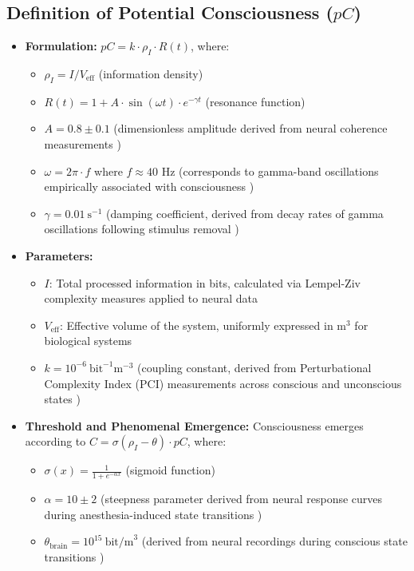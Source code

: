\documentclass[12pt]{article}
\begin{document}
\subsection{Definition of Potential Consciousness ($pC$)}
\begin{itemize}
    \item \textbf{Formulation:} $pC = k \cdot \rho_I \cdot R(t)$, where:
    \begin{itemize}
        \item $\rho_I = I / V_{\text{eff}}$ (information density)
        \item $R(t) = 1 + A \cdot \sin(\omega t) \cdot e^{-\gamma t}$ (resonance function)
        \item $A = 0.8 \pm 0.1$ (dimensionless amplitude derived from neural coherence measurements \cite{melloni2007})
        \item $\omega = 2\pi \cdot f$ where $f \approx 40$ Hz (corresponds to gamma-band oscillations empirically associated with consciousness \cite{crick1990,dehaene2011})
        \item $\gamma = 0.01~\text{s}^{-1}$ (damping coefficient, derived from decay rates of gamma oscillations following stimulus removal \cite{buzsaki2004,fries2015})
    \end{itemize}
    
    \item \textbf{Parameters:} 
    \begin{itemize}[label=--]
        \item $I$: Total processed information in bits, calculated via Lempel-Ziv complexity measures applied to neural data \cite{schartner2015}
        \item $V_{\text{eff}}$: Effective volume of the system, uniformly expressed in $\text{m}^3$ for biological systems
        \item $k = 10^{-6}~\text{bit}^{-1}\text{m}^{-3}$ (coupling constant, derived from Perturbational Complexity Index (PCI) measurements across conscious and unconscious states \cite{casali2013,casarotto2016})
    \end{itemize}
    
    \item \textbf{Threshold and Phenomenal Emergence:} Consciousness emerges according to $C = \sigma(\rho_I - \theta) \cdot pC$, where:
    \begin{itemize}[label=--]
        \item $\sigma(x) = \frac{1}{1 + e^{-\alpha x}}$ (sigmoid function)
        \item $\alpha = 10 \pm 2$ (steepness parameter derived from neural response curves during anesthesia-induced state transitions \cite{chennu2014,storm2017})
        \item $\theta_{\text{brain}} = 10^{15}~\text{bit/m}^3$ (derived from neural recordings during conscious state transitions \cite{tononi2016,mashour2020})
    \end{itemize}
\end{itemize}
\end{document}
